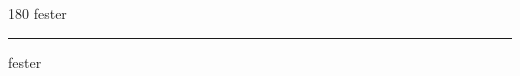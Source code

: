 
\begin{frame}
\begin{center}
\begin{turn}{180}
{\fontsize{2.5cm}{1em}\selectfont fester}
\end{turn}
\vspace{1em}\par  
\hrule
\vspace{1em}\par  
{\fontsize{2.5cm}{1em}\selectfont fester}
\end{center}
\end{frame}
